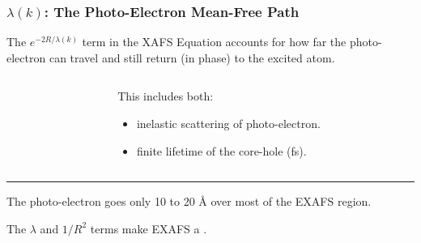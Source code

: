 \begin{frame} \frametitle{ $\lambda(k)$: The Photo-Electron Mean-Free Path }

 \begin{cenpage}{102mm}
  The $ e^{-2R/\lambda(k)} $ term in the XAFS Equation accounts for how far the
   photo-electron can travel and still return (in phase) to the excited atom.
 \begin{columns}
   \begin{column}{55mm}
   \end{column}
   \begin{column}{60mm}

     This includes both:

     \begin{itemize}
     \item  inelastic scattering of photo-electron.
     \item  finite lifetime of the core-hole (fs).
     \end{itemize}
     \vmm

   \end{column}
 \end{columns}

 \vmm\hrule\vmm

The photo-electron goes only {10 to 20 \AA}  over most of the EXAFS region. 

 \begin{postitbox}{80mm}
     The $\lambda$ and $1/R^{2}$ terms make EXAFS a  {}.
   \end{postitbox}

  \end{cenpage}
\end{frame}



